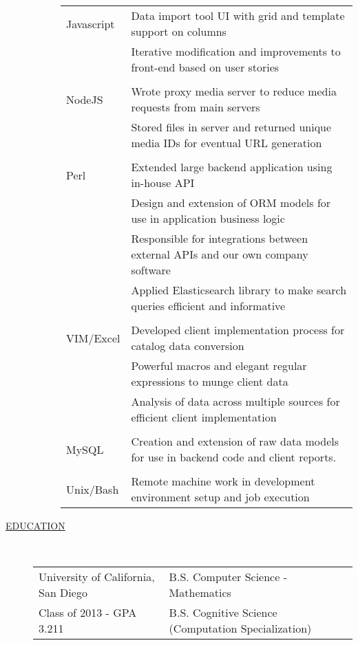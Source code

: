 \documentclass[11pt]{article}
\begin{document}
\begin{description}
\begin{description}
                \begin{tabular}{l|l}
                    Javascript & Data import tool UI with grid and template support on columns\\
                               & Iterative modification and improvements to front-end based on user stories\\
                                 \\
                    NodeJS     & Wrote proxy media server to reduce media requests from main servers \\
                               & Stored files in server and returned unique media IDs for eventual URL generation\\
                                 \\
                    Perl   & Extended large backend application using in-house API \\
                               & Design and extension of ORM models for use in application business logic \\
                               & Responsible for integrations between external APIs and our own company software \\
                               & Applied Elasticsearch library to make search queries efficient and informative\\
                                 \\
                    VIM/Excel  & Developed client implementation process for catalog data conversion\\
                               & Powerful macros and elegant regular expressions to munge client data\\
                               & Analysis of data across multiple sources for efficient client implementation\\
                                 \\
                    MySQL      & Creation and extension of raw data models for use in backend code and client reports.\\
                                 \\
                    Unix/Bash  & Remote machine work in development environment setup and job execution\\
                \end{tabular}

		\end{description}

    \item[\underline{EDUCATION}]  \hfill \\
        \begin{tabular}{l|l}
            University of California, San Diego & B.S. Computer Science - Mathematics \\
            \hfill Class of 2013 - GPA 3.211    & B.S. Cognitive Science (Computation Specialization)\\
		\end{tabular}


\end{description}
\end{document}
